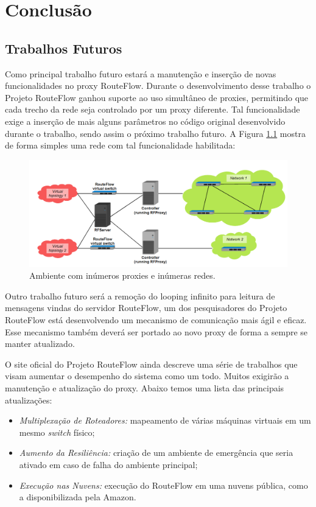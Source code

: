 \chapter{Conclusão}

\section{Trabalhos Futuros}

Como principal trabalho futuro estará a manutenção e 
inserção de novas funcionalidades no proxy RouteFlow.
Durante o desenvolvimento desse trabalho o Projeto
 RouteFlow ganhou suporte ao uso simultâneo de proxies, 
permitindo que cada trecho da rede seja controlado por um
proxy diferente. Tal funcionalidade exige a inserção de 
mais alguns parâmetros no código original desenvolvido
 durante o trabalho, sendo assim o próximo trabalho futuro.
A Figura \ref{fig:multiplosProxies} mostra de forma simples 
uma rede com tal funcionalidade habilitada:

\begin{figure}[h] 
\centering
\includegraphics[width=160mm]{multiplosProxies.png}
\caption{Ambiente com inúmeros proxies e inúmeras redes.}
\label{fig:multiplosProxies} 
\end{figure}

Outro trabalho futuro será a remoção do looping infinito 
para leitura de mensagens vindas do servidor RouteFlow, 
um dos pesquisadores do Projeto RouteFlow está
desenvolvendo um mecanismo de comunicação mais ágil e
 eficaz. Esse mecanismo também deverá ser portado ao 
 novo proxy de forma a sempre se manter atualizado.

O site oficial do Projeto RouteFlow ainda descreve uma 
série de trabalhos que visam aumentar o desempenho do
sistema como um todo. Muitos exigirão a manutenção e 
atualização do proxy. Abaixo temos uma lista das principais
atualizações:

\begin{itemize}
\item \textit{Multiplexação de Roteadores:} mapeamento
de várias máquinas virtuais em um mesmo \textit{switch}
físico;
\item \textit{Aumento da Resiliência:} criação de um ambiente
de emergência que seria ativado em caso de falha do ambiente
principal;
\item \textit{Execução nas Nuvens:} execução do RouteFlow
em uma nuvens pública, como a disponibilizada pela Amazon.
\end{itemize}

